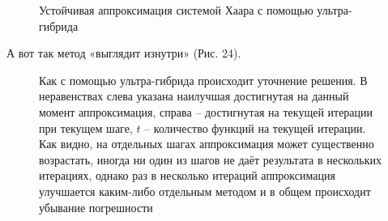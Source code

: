 ﻿\documentclass[a4paper, 12pt]{article}
\begin{document}
\begin{figure}[h!]
    \noindent{}
   \caption{Устойчивая аппроксимация системой Хаара с помощью ультра-гибрида}
    \label{figCurves}
\end{figure}

А вот так метод «выглядит изнутри» (Рис. 24).

\begin{figure}[h!]
    \noindent{}
   \caption{Как с помощью ультра-гибрида происходит уточнение решения. В неравенствах слева указана наилучшая достигнутая на данный момент аппроксимация, справа -- достигнутая на текущей итерации при текущем шаге, $t$ -- количество функций на текущей итерации. Как видно, на отдельных шагах аппроксимация может существенно возрастать, иногда ни один из шагов не даёт результата в нескольких итерациях, однако раз в несколько итераций аппроксимация улучшается каким-либо отдельным методом и в общем происходит убывание погрешности}
    \label{figCurves}
\end{figure}
\end{document}
